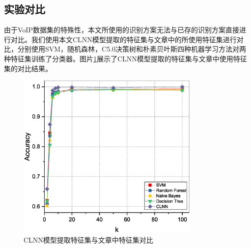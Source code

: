 \subsection{实验对比}
由于VoIP数据集的特殊性，本文所使用的识别方案无法与已存的识别方案直接进行对比。我们使用本文CLNN模型提取的特征集与文章\supercite{5}中的所使用特征集进行对比，分别使用SVM，随机森林，C5.0决策树和朴素贝叶斯四种机器学习方法对两种特征集训练了分类器。图片\ref{fig:ml}展示了CLNN模型提取的特征集与文章\supercite{5}中使用特征集的对比结果。

\begin{figure}
  \centering
  \includegraphics[width=0.8\textwidth]{figures/ml.eps}
  \caption{CLNN模型提取特征集与文章\supercite{5}中特征集对比}
  \label{fig:ml}
\end{figure}



